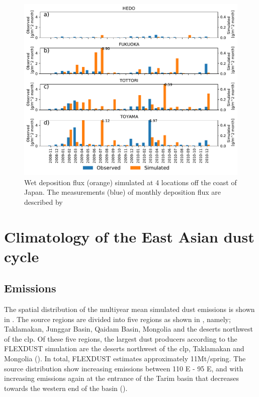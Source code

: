 \begin{figure}[hptb]
    \centering
    \includegraphics[width=\textwidth]{texfiles/figs/monthly_accumulated_wet_depostion_japan.pdf}
    \caption{Wet deposition flux (orange) simulated at 4 locations off the coast of Japan. The measurements (blue) of monthly deposition flux are described by \textcite{osada2014wet}}
    \label{fig:model_eval_wet_deposition}
\end{figure}

\section{Climatology of the East Asian dust cycle}\label{sec:result_average}

\subsection{Emissions}
The spatial distribution of the multiyear mean simulated dust emissions is shown in . 
The source regions are divided into five regions as shown in , namely; Taklamakan, Junggar Basin, Qaidam Basin, Mongolia and the deserts northwest of the \acrshort{clp}. 
Of these five regions, the largest dust producers according to the FLEXDUST simulation are the deserts northwest of the \acrshort{clp}, Taklamakan and Mongolia (). 
In total, FLEXDUST estimates approximately 11Mt/spring.
The source distribution show increasing emissions between 110 \degree E - 95 \degree E, and with increasing emissions again at the entrance of the Tarim basin that decreases towards the western end of the basin ().    

